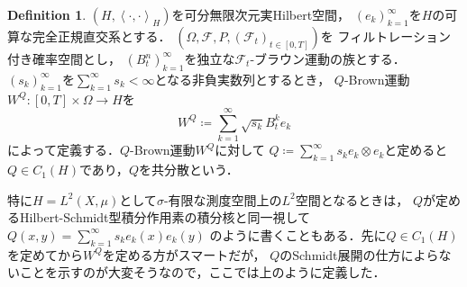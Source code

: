 \documentclass[dvipdfmx,autodetect-engine]{jsarticle}
\theoremstyle{remark}
\theoremstyle{definition}
\newtheorem{definition}{Definition}[section]
\newcommand{\iprod}[1]{\left\langle #1 \right\rangle}
\begin{document}
\begin{definition}
    $(H,\iprod{\cdot,\cdot}_{H})$を可分無限次元実Hilbert空間，
    $(e_{k})_{k=1}^{\infty}$を$H$の可算な完全正規直交系とする．
    $(\Omega,\mathcal{F},P,(\mathcal{F}_{t})_{t\in [0,T]})$を
    フィルトレーション付き確率空間とし，
    $(B_{t}^{n})_{k=1}^{\infty}$を独立な$\mathcal{F}_{t}$-ブラウン運動の族とする．
    $(s_{k})_{k=1}^{\infty}$を$\sum_{k=1}^{\infty} s_{k} < \infty$となる非負実数列とするとき，
    $Q$-Brown運動$W^{Q}\colon [0,T] \times \Omega \to H$を
    \begin{equation}
        W^{Q} \coloneqq \sum_{k=1}^{\infty} \sqrt{s_{k}} B_{t}^{k} e_{k}
    \end{equation}
    によって定義する．$Q$-Brown運動$W^{Q}$に対して
    $Q \coloneqq \sum_{k=1}^{\infty} s_{k} e_{k} \otimes e_{k}$と定めると
    $Q \in C_{1}(H)$であり，$Q$を共分散という．
\end{definition}


特に$H = L^{2}(X,\mu)$として$\sigma$-有限な測度空間上の$L^2$空間となるときは，
$Q$が定めるHilbert-Schmidt型積分作用素の積分核と同一視して
$Q(x,y) = \sum_{k=1}^{\infty} s_{k} e_{k}(x)e_{k}(y)$
のように書くこともある．先に$Q\in C_{1}(H)$を定めてから$W^{Q}$を定める方がスマートだが，
$Q$のSchmidt展開の仕方によらないことを示すのが大変そうなので，ここでは上のように定義した．
\end{document}

